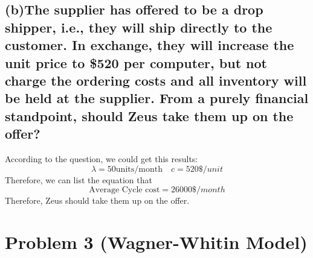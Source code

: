 \documentclass[a4paper,12pt]{journal}
\begin{document}
	\subsection*{(b)The supplier has offered to be a drop shipper, i.e., they will ship directly to the customer. In exchange, they will increase the unit price to \$520 per computer, but not charge the ordering costs and all inventory will be held at the supplier. From a purely financial standpoint, should Zeus take them up on the offer?}
	According to the question, we could get this results:
	\begin{equation}
			\lambda=50\text{units/month}\quad c=520\$/unit
	\end{equation}
	Therefore, we can list the equation that 
	\begin{equation}
		\text{Average Cycle cost}=26000\$/month
	\end{equation}
	Therefore, Zeus should take them up on the offer.
	\section*{Problem 3 (Wagner-Whitin Model)}
\end{document}
